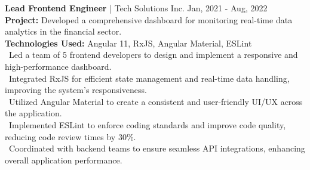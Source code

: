 {\textbf{Lead Frontend Engineer} | Tech Solutions Inc. \hfill Jan, 2021 - Aug, 2022} \\
\textbf{Project:} Developed a comprehensive dashboard for monitoring real-time data analytics in the financial sector. \\
\textbf{Technologies Used:} Angular 11, RxJS, Angular Material, ESLint \\
\hspace*{4pt} \textbullet~Led a team of 5 frontend developers to design and implement a responsive and high-performance dashboard. \\
\hspace*{4pt} \textbullet~Integrated RxJS for efficient state management and real-time data handling, improving the system's responsiveness. \\
\hspace*{4pt} \textbullet~Utilized Angular Material to create a consistent and user-friendly UI/UX across the application. \\
\hspace*{4pt} \textbullet~Implemented ESLint to enforce coding standards and improve code quality, reducing code review times by 30\%. \\
\hspace*{4pt} \textbullet~Coordinated with backend teams to ensure seamless API integrations, enhancing overall application performance. \\[4pt]
